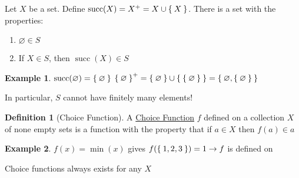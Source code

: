 \documentclass[12pt]{amsart}
\theoremstyle{plain}
\theoremstyle{remark}
\theoremstyle{definition}
\newtheorem*{define}{Definition}
\newtheorem*{eg}{Example}
\begin{document}
\begin{AXM}
	Let $X$ be a set. Define $\operatorname{succ}(X) = X^+ =  X \cup \Set{X}$. 
	\newline
	There is a set with the properties:
	\begin{enumerate}[(1)]
		\item $\varnothing \in S$
		\item If $X \in S$, then $\operatorname{succ}(X) \in S$
	\end{enumerate}
\end{AXM}
\begin{eg}
	\hfill
	\newline
	$\operatorname{succ}(\varnothing) = \Set{\varnothing}$
	\newline
	$\Set{\varnothing}^+ = \Set{\varnothing} \cup \Set{\Set{\varnothing}} = \Set{\varnothing, \Set{\varnothing}}$
\end{eg}
	In particular, $S$ cannot have finitely many elements!
\begin{define}[Choice Function]
	A \ul{Choice Function} $f$ defined on a collection $X$ of none empty sets is a function with the property that if $a \in X$ then $f(a) \in a$
\end{define}

\begin{eg}
	$f(x) = \min(x)$ gives $f(\Set{1,2,3}) = 1 \rightarrow f$ is defined on  
\end{eg}

\begin{AXM}
	Choice functions always exists for any $X$
\end{AXM}
\end{document}
